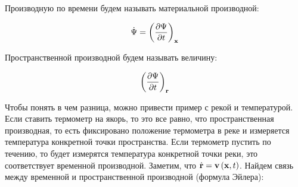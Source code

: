 \documentclass[a4papper, 14pt]{book}
\newcommand{\mf}[1]{\ensuremath\mathbf{#1}}
\theoremstyle{plain} %
\theoremstyle{definition} %
\theoremstyle{remark} %
\begin{document}
	Производную по времени будем называть материальной производной:
	
	$$
	\dot{\Psi} = \left( \dfrac{\partial\Psi}{\partial t} \right)_{\mf{x}}
	$$
	
	Пространственной производной будем называть величину:
	
	$$
	\left(\dfrac{\partial\Psi}{\partial t}\right)_{\mf{r}}
	$$
	
	Чтобы понять в чем разница, можно привести пример с рекой и температурой. Если ставить термометр на якорь, то это все равно, что пространственная производная, то есть фиксировано положение термометра в реке и измеряется температура конкретной точки пространства. Если термометр пустить по течению, то будет измерятся температура конкретной точки реки, это соответствует временной производной. Заметим, что $\dot{\mf{r}} = \mf{v}\left(\mf{x}, t\right)$. Найдем связь между временной и пространственной производной (формула Эйлера):
	
\end{document}
